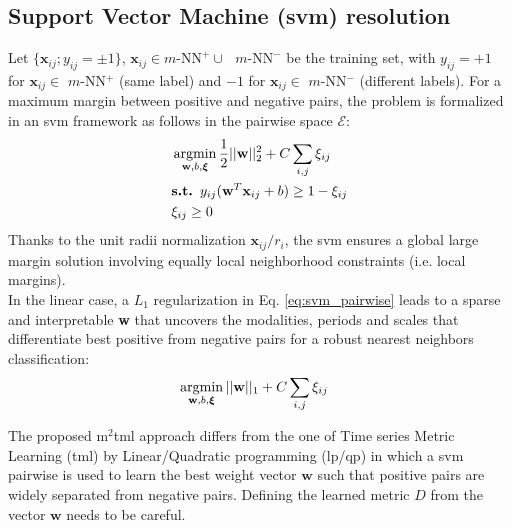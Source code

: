\subsection{Support Vector Machine ({\sc svm}) resolution}
Let $\{\textbf{x}_{ij}; y_{ij} = \pm 1\}$, $\textbf{x}_{ij} \in m\text{-NN}^+ \cup \text{  } m\text{-NN}^-$ be the training set, with $y_{ij} = +1$ for $\textbf{x}_{ij} \in$ $m$-NN$^+$ (same label) and $-1$ for $\textbf{x}_{ij} \in$ $m$-NN$^-$ (different labels). For a maximum margin between positive and negative pairs, the problem is formalized in an {\sc svm} framework as follows in the pairwise space $\mathcal{E}$:
\begin{align}
	& \argmin_{\textbf{w},b,\boldsymbol{\xi}} \frac{1}{2}||\textbf{w}||_2^2 + C \sum\limits_{i,j} \xi_{ij} \label{eq:svm_pairwise}\\
	&\textbf{s.t. } y_{ij}(\textbf{w}^T \textbf{x}_{ij} + b) \geq 1-\xi_{ij} \\
	&\xi_{ij} \geq 0
\end{align}
Thanks to the unit radii normalization $\textbf{x}_{ij}/r_i$, the {\sc svm} ensures a global large margin solution involving equally local neighborhood constraints (i.e. local margins). \\
In the linear case, a $L_1$ regularization in Eq. \ref{eq:svm_pairwise} leads to a sparse and interpretable \textbf{w} that uncovers the modalities, periods and scales that differentiate best positive from negative pairs for a robust nearest neighbors classification:
\begin{align}
& \argmin_{\textbf{w},b,\boldsymbol{\xi}} ||\textbf{w}||_1 + C \sum\limits_{i,j} \xi_{ij} \label{eq:svm_pairwiseL1}
\end{align}

The proposed {\sc m}$^2${\sc tml} approach differs from the one of Time series Metric Learning ({\sc tml}) by Linear/Quadratic programming ({\sc lp}/{\sc qp}) in which a {\sc svm} pairwise is used to learn the best weight vector $\textbf{w}$ such that positive pairs are widely separated from negative pairs. Defining the learned metric $D$ from the vector $\textbf{w}$ needs to be careful.

